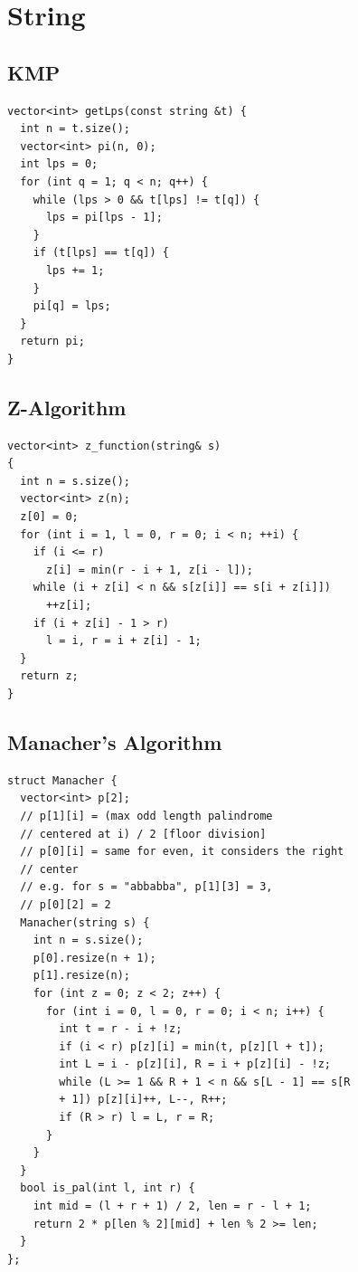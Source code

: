 \section{String}
\subsection{KMP}
\begin{verbatim}
vector<int> getLps(const string &t) {
  int n = t.size();
  vector<int> pi(n, 0);
  int lps = 0;
  for (int q = 1; q < n; q++) {
    while (lps > 0 && t[lps] != t[q]) {
      lps = pi[lps - 1];
    }
    if (t[lps] == t[q]) {
      lps += 1;
    }
    pi[q] = lps;
  }
  return pi;
}
\end{verbatim}
\subsection{Z-Algorithm}
\begin{verbatim}
vector<int> z_function(string& s)
{
  int n = s.size();
  vector<int> z(n);
  z[0] = 0;
  for (int i = 1, l = 0, r = 0; i < n; ++i) {
    if (i <= r)
      z[i] = min(r - i + 1, z[i - l]);
    while (i + z[i] < n && s[z[i]] == s[i + z[i]])
      ++z[i];
    if (i + z[i] - 1 > r)
      l = i, r = i + z[i] - 1;
  }
  return z;
}
\end{verbatim}
\subsection{Manacher's Algorithm}
\begin{verbatim}
struct Manacher {
  vector<int> p[2];
  // p[1][i] = (max odd length palindrome
  // centered at i) / 2 [floor division]
  // p[0][i] = same for even, it considers the right
  // center
  // e.g. for s = "abbabba", p[1][3] = 3,
  // p[0][2] = 2
  Manacher(string s) {
    int n = s.size();
    p[0].resize(n + 1);
    p[1].resize(n);
    for (int z = 0; z < 2; z++) {
      for (int i = 0, l = 0, r = 0; i < n; i++) {
        int t = r - i + !z;
        if (i < r) p[z][i] = min(t, p[z][l + t]);
        int L = i - p[z][i], R = i + p[z][i] - !z;
        while (L >= 1 && R + 1 < n && s[L - 1] == s[R
        + 1]) p[z][i]++, L--, R++;
        if (R > r) l = L, r = R;
      }
    }
  }
  bool is_pal(int l, int r) {
    int mid = (l + r + 1) / 2, len = r - l + 1;
    return 2 * p[len % 2][mid] + len % 2 >= len;
  }
};
\end{verbatim}
